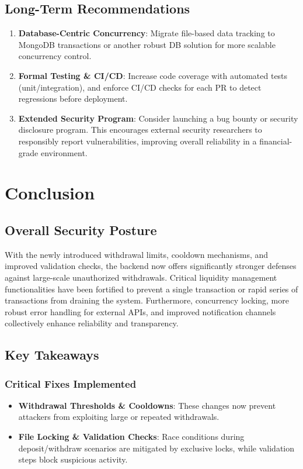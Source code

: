 \documentclass[11pt,a4paper]{report}
\begin{document}
\section{Long-Term Recommendations}
\begin{enumerate}
    \item \textbf{Database-Centric Concurrency}: Migrate file-based data tracking to MongoDB transactions or another robust DB solution for more scalable concurrency control.
    \item \textbf{Formal Testing \& CI/CD}: Increase code coverage with automated tests (unit/integration), and enforce CI/CD checks for each PR to detect regressions before deployment.
    \item \textbf{Extended Security Program}: Consider launching a bug bounty or security disclosure program. This encourages external security researchers to responsibly report vulnerabilities, improving overall reliability in a financial-grade environment.
\end{enumerate}

\chapter{Conclusion}

\section{Overall Security Posture}
With the newly introduced withdrawal limits, cooldown mechanisms, and improved validation checks, the backend now offers significantly stronger defenses against large-scale unauthorized withdrawals. Critical liquidity management functionalities have been fortified to prevent a single transaction or rapid series of transactions from draining the system. Furthermore, concurrency locking, more robust error handling for external APIs, and improved notification channels collectively enhance reliability and transparency.

\section{Key Takeaways}

\subsection{Critical Fixes Implemented}
\begin{itemize}
    \item \textbf{Withdrawal Thresholds \& Cooldowns}: These changes now prevent attackers from exploiting large or repeated withdrawals.
    \item \textbf{File Locking \& Validation Checks}: Race conditions during deposit/withdraw scenarios are mitigated by exclusive locks, while validation steps block suspicious activity.
\end{itemize}
\end{document}
